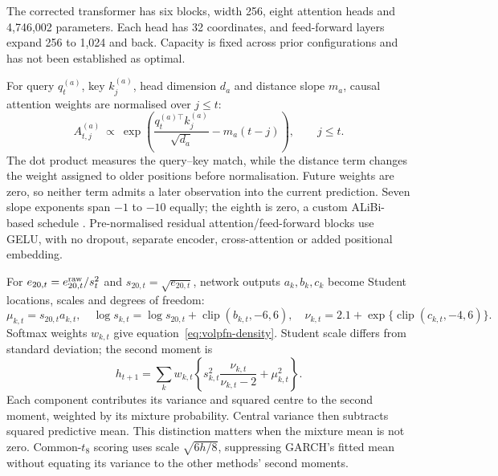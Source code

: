 The corrected transformer has six blocks, width 256, eight attention heads and 4,746,002 parameters. Each head has 32 coordinates, and feed-forward layers expand 256 to 1,024 and back. Capacity is fixed across prior configurations and has not been established as optimal.

For query $q_t^{(a)}$, key $k_j^{(a)}$, head dimension $d_a$ and distance slope $m_a$, causal attention weights are normalised over $j\leq t$:
\begin{equation}
 A_{t,j}^{(a)}\ \propto\
 \exp\!\left(\frac{q_t^{(a)\top}k_j^{(a)}}{\sqrt{d_a}}-m_a(t-j)\right),
 \qquad j\leq t.
 \label{eq:volpfn-attention}
\end{equation}
The dot product measures the query--key match, while the distance term changes the weight assigned to older positions before normalisation. Future weights are zero, so neither term admits a later observation into the current prediction. Seven slope exponents span $-1$ to $-10$ equally; the eighth is zero, a custom ALiBi-based schedule \citep{press2022alibi}. Pre-normalised residual attention/feed-forward blocks use GELU, with no dropout, separate encoder, cross-attention or added positional embedding.

For $e_{20,t}=e^{\rm raw}_{20,t}/s_t^2$ and $s_{20,t}=\sqrt{e_{20,t}}$, network outputs $a_k,b_k,c_k$ become Student locations, scales and degrees of freedom:
\[
 \mu_{k,t}=s_{20,t}a_{k,t},\quad
 \log s_{k,t}=\log s_{20,t}+\operatorname{clip}(b_{k,t},-6,6),\quad
 \nu_{k,t}=2.1+\exp\{\operatorname{clip}(c_{k,t},-4,6)\}.
\]
Softmax weights $w_{k,t}$ give equation~\eqref{eq:volpfn-density}. Student scale differs from standard deviation; the second moment is
\begin{equation}
 h_{t+1}=\sum_k w_{k,t}\left\{
 s_{k,t}^{2}\frac{\nu_{k,t}}{\nu_{k,t}-2}+\mu_{k,t}^{2}\right\}.
 \label{eq:volpfn-second-moment}
\end{equation}
Each component contributes its variance and squared centre to the second moment, weighted by its mixture probability. Central variance then subtracts squared predictive mean. This distinction matters when the mixture mean is not zero. Common-$t_8$ scoring uses scale $\sqrt{6h/8}$, suppressing GARCH's fitted mean without equating its variance to the other methods' second moments.

